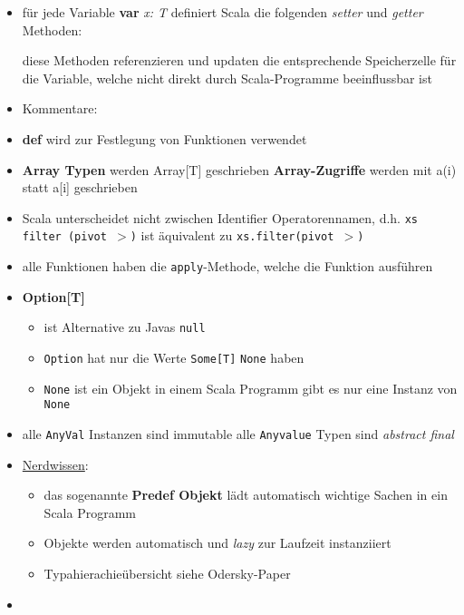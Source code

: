 \begin{itemize}
  
  \item für jede Variable \textbf{var} \textit{x: T} definiert Scala
  die folgenden \textit{setter} und \textit{getter} Methoden:
  
  
  
  diese Methoden referenzieren und updaten die entsprechende Speicherzelle für
  die Variable, welche nicht direkt durch Scala-Programme beeinflussbar ist
  \item Kommentare:

  \item \textbf{def} wird zur Festlegung von Funktionen verwendet
  \item \textbf{Array Typen} werden Array[T] geschrieben \und 
  \textbf{Array-Zugriffe} werden mit a(i) statt a[i] geschrieben
  \item Scala unterscheidet nicht zwischen Identifier \und Operatorennamen,
  d.h. \texttt{xs filter (pivot $>$)} ist äquivalent zu 
  \texttt{xs.filter(pivot $>$)}
  \item alle Funktionen haben die \texttt{apply}-Methode, welche die 
  Funktion ausführen
  \item \textbf{Option[T]}
  \begin{itemize}
    \item ist Alternative zu Javas \texttt{null}
    \item \texttt{Option} hat nur die Werte \texttt{Some[T]} \oder 
    \texttt{None} haben
    \item \texttt{None} ist ein Objekt \und in einem Scala Programm gibt es
    nur eine Instanz von \texttt{None}
  \end{itemize}
  \item alle \texttt{AnyVal} Instanzen sind immutable \und alle 
  \texttt{Anyvalue} Typen sind \textit{abstract final}
  \item \uline{Nerdwissen}:
  \begin{itemize}
    \item das sogenannte \textbf{Predef Objekt} lädt automatisch
    wichtige Sachen in ein Scala Programm
    \item Objekte werden automatisch und \textit{lazy} zur Laufzeit
    instanziiert
    \item Typahierachieübersicht siehe Odersky-Paper
  \end{itemize}
  
  \item {}


\end{itemize}

